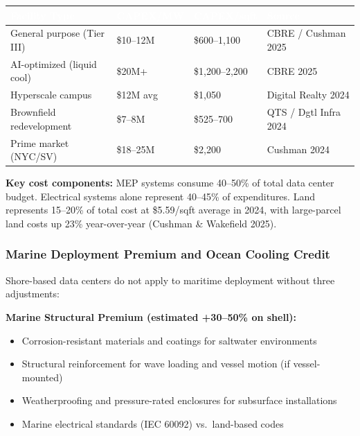 \documentclass[11pt,letterpaper]{article}
\newcommand{\tableheader}[1]{\textbf{\sffamily\textcolor{white}{#1}}}
\begin{document}
\begin{center}
\begin{tabularx}{\textwidth}{L{4.5cm}C{2.5cm}C{2.5cm}L{3cm}}
\toprule
{}
\tableheader{Facility Type} & \tableheader{CAPEX/MW} & \tableheader{CAPEX/sqft} & \tableheader{Source} \\
\midrule
General purpose (Tier III) & \$10--12M & \$600--1,100 & CBRE / Cushman 2025 \\
AI-optimized (liquid cool) & \$20M+ & \$1,200--2,200 & CBRE 2025 \\
Hyperscale campus & \$12M avg & \$1,050 & Digital Realty 2024 \\
Brownfield redevelopment & \$7--8M & \$525--700 & QTS / Dgtl Infra 2024 \\
Prime market (NYC/SV) & \$18--25M & \$2,200 & Cushman 2024 \\
\bottomrule
\end{tabularx}
\end{center}

\textbf{Key cost components:} MEP systems consume 40--50\% of total data center budget. Electrical
systems alone represent 40--45\% of expenditures. Land represents 15--20\% of total cost at
\$5.59/sqft average in 2024, with large-parcel land costs up 23\% year-over-year (Cushman
\& Wakefield 2025).

\subsubsection{Marine Deployment Premium and Ocean Cooling Credit}

Shore-based data centers do not apply to maritime deployment without three adjustments:

\textbf{Marine Structural Premium (estimated +30--50\% on shell):}
\begin{itemize}[itemsep=2pt]
  \item Corrosion-resistant materials and coatings for saltwater environments
  \item Structural reinforcement for wave loading and vessel motion (if vessel-mounted)
  \item Weatherproofing and pressure-rated enclosures for subsurface installations
  \item Marine electrical standards (IEC 60092) vs.\ land-based codes
\end{itemize}
\end{document}
